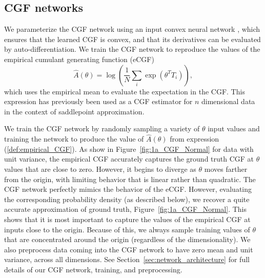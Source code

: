 \documentclass{article}      %
\begin{document}
\subsection{CGF networks}
We parameterize the CGF network using an input convex neural network \cite{amos_input_2017,hoedt_principled_2023}, which ensures that the learned CGF is convex, and that its derivatives can be evaluated by auto-differentiation.
We train the CGF network to reproduce the values of the empirical cumulant generating function (eCGF)
\begin{equation}
  \hat A(\theta) = \log \left( \frac{1}{N}\sum_{i} \exp(\theta^T T_i) \right), \label{def:empirical_CGF}
\end{equation}
which uses the empirical mean to evaluate the expectation in the CGF. 
This expression has previously been used as a CGF estimator for $n$ dimensional data \cite{davison_saddlepoint_1988,ronchetti_empirical_1994} in the context of saddlepoint approximation.

We train the CGF network by randomly sampling a variety of $\theta$ input values and training the network to produce the value of $\hat A(\theta)$ from expression (\ref{def:empirical_CGF}).
As show in Figure~\ref{fig:1a_CGF_Normal} for data with unit variance, the empirical CGF accurately captures the ground truth CGF at $\theta$ values that are close to zero.
However, it begins to diverge as $\theta$ moves farther from the origin, with limiting behavior that is linear rather than quadratic. 
The CGF network perfectly mimics the behavior of the eCGF.
However, evaluating the corresponding probability density (as described below), we recover a quite accurate approximation of ground truth, Figure~\ref{fig:1a_CGF_Normal}.
This shows that it is most important to capture the values of the empirical CGF at inputs close to the origin.
Because of this, we always sample training values of $\theta$ that are concentrated around the origin (regardless of the dimensionality).
We also preprocess data coming into the CGF network to have zero mean and unit variance, across all dimensions. 
See Section~\ref{sec:network_architecture} for full details of our CGF network, training, and preprocessing.
\end{document}
